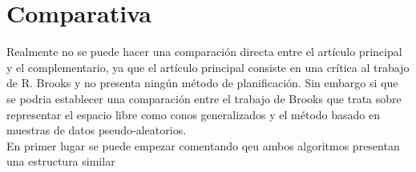 \section{Comparativa}
\label{articulos_comparativa}

Realmente no se puede hacer una comparación directa entre el artículo principal y el complementario, ya que el artículo principal consiste en una crítica al trabajo de R. Brooks y no presenta ningún método de planificación. Sin embargo si que se podria establecer una comparación entre el trabajo de Brooks que trata sobre representar el espacio libre como conos generalizados y el método basado en muestras de datos pseudo-aleatorios.\\

En primer lugar se puede empezar comentando qeu ambos algoritmos presentan una estructura similar  